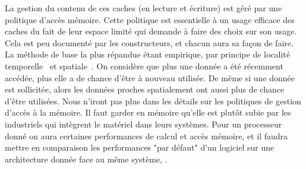 \documentclass[french, a4paper, 11pt, twoside, pdftex]{StyleThese}
\begin{document}
			La gestion du contenu de ces caches (en lecture et écriture) est géré par une politique d'accès mémoire. Cette politique est essentielle à un usage efficace des caches du fait de leur espace limité qui demande à faire des choix sur son usage. Cela est peu documenté par les constructeurs,  et chacun aura sa façon de faire.
			La méthode de base la plus répandue étant empirique, par principe de localité temporelle~\cite{durrieu2014predictable} et spatiale~\cite{wilkes1965slave}. On considère que plus une donnée a été récemment accédée, plus elle a de chance d'être à nouveau utilisée. De même si une donnée est sollicitée, alors les données proches spatialement ont aussi plus de chance d'être utilisées. 
			Nous n'iront pas plus dans les détails sur les politiques de gestion d'accès à la mémoire. Il faut garder en mémoire qu'elle est plutôt subie par les industriels qui intègrent le matériel dans leurs systèmes. Pour un processeur donné on aura certaines performances de calcul et accès mémoire, et il faudra mettre en comparaison les performances "par défaut" d'un logiciel sur une architecture donnée face au même système, .

			
			
\end{document}
